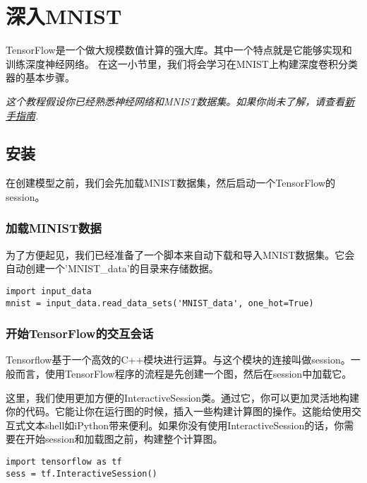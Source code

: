 


\newpage
\section {深入MNIST} \label{MINIST_pros}
TensorFlow是一个做大规模数值计算的强大库。其中一个特点就是它能够实现和训练深度神经网络。 在这一小节里，我们将会学习在MNIST上构建深度卷积分类器的基本步骤。

\emph{这个教程假设你已经熟悉神经网络和MNIST数据集。如果你尚未了解，请查看\hyperref[MINIST_beginner]{新手指南}.}

\subsection {安装}
在创建模型之前，我们会先加载MNIST数据集，然后启动一个TensorFlow的session。

\subsubsection {加载MINIST数据}

为了方便起见，我们已经准备了一个脚本来自动下载和导入MNIST数据集。它会自动创建一个'MNIST\_data'的目录来存储数据。

\begin{lstlisting}
import input_data
mnist = input_data.read_data_sets('MNIST_data', one_hot=True)
\end{lstlisting}

\subsubsection {开始TensorFlow的交互会话}

Tensorflow基于一个高效的C++模块进行运算。与这个模块的连接叫做session。一般而言，使用TensorFlow程序的流程是先创建一个图，然后在session中加载它。

这里，我们使用更加方便的InteractiveSession类。通过它，你可以更加灵活地构建你的代码。它能让你在运行图的时候，插入一些构建计算图的操作。这能给使用交互式文本shell如iPython带来便利。如果你没有使用InteractiveSession的话，你需要在开始session和加载图之前，构建整个计算图。

\begin{lstlisting}
import tensorflow as tf
sess = tf.InteractiveSession()
\end{lstlisting}

